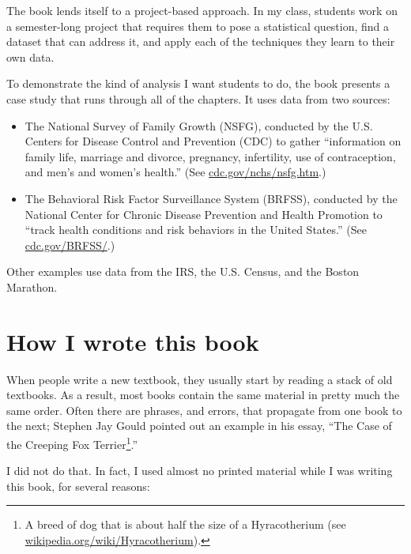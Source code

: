 \documentclass[12pt]{book}
\begin{document}
The book lends itself to a project-based approach.  In my class, students
work on a semester-long project that requires them to pose a statistical
question, find a dataset that can address it, and apply each of the
techniques they learn to their own data.

To demonstrate the kind of analysis I want students to do,
the book presents a case study that runs through all of the chapters.
It uses data from two sources:

\begin{itemize}

\item The National Survey of Family Growth (NSFG), conducted by the
  U.S. Centers for Disease Control and Prevention (CDC) to gather
  ``information on family life, marriage and divorce, pregnancy,
  infertility, use of contraception, and men's and women's health.''
  (See \url{cdc.gov/nchs/nsfg.htm}.)

\item The Behavioral Risk Factor Surveillance System (BRFSS),
  conducted by the National Center for Chronic Disease Prevention and
  Health Promotion to ``track health conditions and risk behaviors in
  the United States.''  (See \url{cdc.gov/BRFSS/}.)

\end{itemize}

Other examples use data from the IRS, the U.S. Census, and
the Boston Marathon.


\section*{How I wrote this book}

When people write a new textbook, they usually start by
reading a stack of old textbooks.  As a result, most books
contain the same material in pretty much the same order.  Often there
are phrases, and errors, that propagate from one book to the next;
Stephen Jay Gould pointed out an example in his essay, ``The Case of
the Creeping Fox Terrier\footnote{A breed of dog that is about half
  the size of a Hyracotherium (see
  \url{wikipedia.org/wiki/Hyracotherium}).}.''

I did not do that.  In fact, I used almost no printed material while I
was writing this book, for several reasons:
\end{document}
